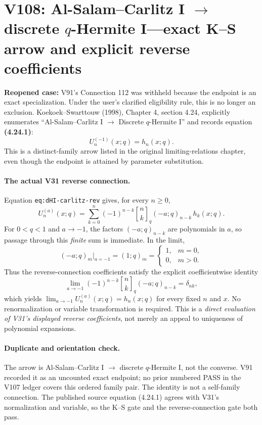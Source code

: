 \documentclass[11pt]{article}
\begin{document}
\clearpage
\section{V108: Al-Salam--Carlitz I $\to$ discrete $q$-Hermite I---exact K--S arrow and explicit reverse coefficients}
\noindent\textbf{Reopened case:} V91's Connection 112 was withheld because the endpoint is an exact specialization. Under the user's clarified eligibility rule, this is no longer an exclusion. Koekoek--Swarttouw (1998), Chapter 4, section 4.24, explicitly enumerates ``Al-Salam--Carlitz I $\to$ Discrete $q$-Hermite I'' and records equation \textbf{(4.24.1)}:
\[
 U_n^{(-1)}(x;q)=h_n(x;q).
\]
This is a distinct-family arrow listed in the original limiting-relations chapter, even though the endpoint is attained by parameter substitution.

\paragraph{The actual V31 reverse connection.}
Equation \texttt{eq:dHI-carlitz-rev} gives, for every $n\geq0$,
\begin{equation}\label{eq:v108-reverse}
 U_n^{(a)}(x;q)=\sum_{k=0}^n (-1)^{n-k}
 {n\brack k}_q(-a;q)_{n-k}\,h_k(x;q).
\end{equation}
For $0<q<1$ and $a\to-1$, the factors $(-a;q)_{n-k}$ are polynomials in $a$, so passage through this \emph{finite} sum is immediate. In the limit,
\[
 (-a;q)_m\big|_{a=-1}=(1;q)_m=\begin{cases}1,&m=0,\\0,&m>0.\end{cases}
\]
Thus the reverse-connection coefficients satisfy the explicit coefficientwise identity
\begin{equation}\label{eq:v108-delta}
 \boxed{\lim_{a\to-1}(-1)^{n-k}{n\brack k}_q(-a;q)_{n-k}=\delta_{nk},}
\end{equation}
which yields $\lim_{a\to-1}U_n^{(a)}(x;q)=h_n(x;q)$ for every fixed $n$ and $x$. No renormalization or variable transformation is required. This is a \emph{direct evaluation of V31's displayed reverse coefficients}, not merely an appeal to uniqueness of polynomial expansions.

\paragraph{Duplicate and orientation check.}
The arrow is Al-Salam--Carlitz I $\to$ discrete $q$-Hermite I, not the converse. V91 recorded it as an uncounted exact endpoint; no prior numbered PASS in the V107 ledger covers this ordered family pair. The identity is not a self-family connection. The published source equation (4.24.1) agrees with V31's normalization and variable, so the K--S gate and the reverse-connection gate both pass.
\end{document}

